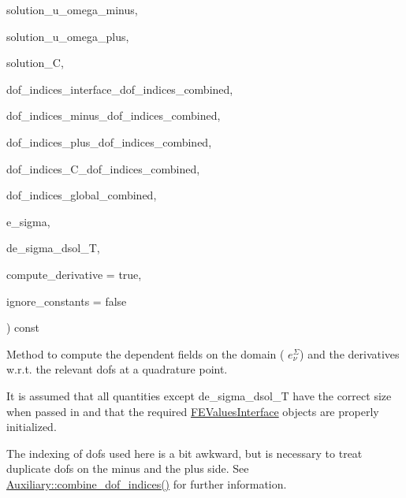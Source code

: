 {\begin{DoxyParamCaption}
\item[{const {\bf Vector}$<$ double $>$ \&}]{solution\+\_\+u\+\_\+omega\+\_\+minus, }
\item[{const {\bf Vector}$<$ double $>$ \&}]{solution\+\_\+u\+\_\+omega\+\_\+plus, }
\item[{const {\bf Vector}$<$ double $>$ \&}]{solution\+\_\+C, }
\item[{const std\+::vector$<$ unsigned int $>$ \&}]{dof\+\_\+indices\+\_\+interface\+\_\+dof\+\_\+indices\+\_\+combined, }
\item[{const std\+::vector$<$ unsigned int $>$ \&}]{dof\+\_\+indices\+\_\+minus\+\_\+dof\+\_\+indices\+\_\+combined, }
\item[{const std\+::vector$<$ unsigned int $>$ \&}]{dof\+\_\+indices\+\_\+plus\+\_\+dof\+\_\+indices\+\_\+combined, }
\item[{const std\+::vector$<$ unsigned int $>$ \&}]{dof\+\_\+indices\+\_\+\+C\+\_\+dof\+\_\+indices\+\_\+combined, }
\item[{const std\+::vector$<$ unsigned int $>$ \&}]{dof\+\_\+indices\+\_\+global\+\_\+combined, }
\item[{{\bf Vector}$<$ double $>$ \&}]{e\+\_\+sigma, }
\item[{{\bf Full\+Matrix}$<$ double $>$ \&}]{de\+\_\+sigma\+\_\+dsol\+\_\+T, }
\item[{const bool}]{compute\+\_\+derivative = {\ttfamily true}, }
\item[{const bool}]{ignore\+\_\+constants = {\ttfamily false}}
\end{DoxyParamCaption}
) const\hspace{0.3cm}{\ttfamily [private]}}\hypertarget{class_assembly_helper_a17cff5d9e32bd2ceac43d9218edd0b9b}{}\label{class_assembly_helper_a17cff5d9e32bd2ceac43d9218edd0b9b}
Method to compute the dependent fields on the domain ( $e^\Sigma_\nu$) and the derivatives w.\+r.\+t. the relevant dofs at a quadrature point.

It is assumed that all quantities except {\ttfamily de\+\_\+sigma\+\_\+dsol\+\_\+T} have the correct size when passed in and that the required \hyperlink{class_f_e_values_interface}{F\+E\+Values\+Interface} objects are properly initialized.

The indexing of dofs used here is a bit awkward, but is necessary to treat duplicate dofs on the minus and the plus side. See \hyperlink{namespace_auxiliary_a1d90ebc8738df3d8c70b540034137019}{Auxiliary\+::combine\+\_\+dof\+\_\+indices()} for further information.


